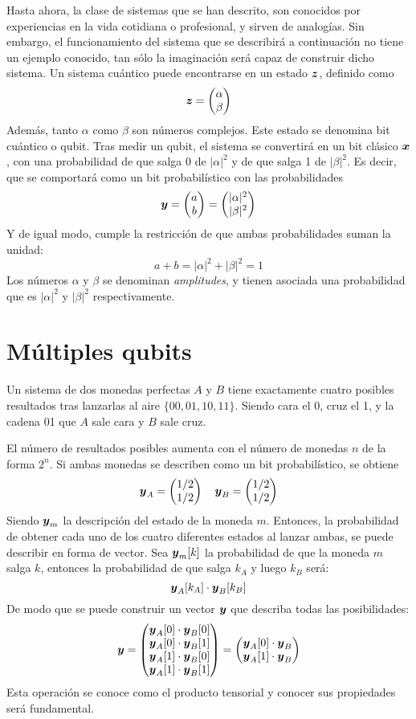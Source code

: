 Hasta ahora, la clase de sistemas que se han descrito, son conocidos por 
experiencias en la vida cotidiana o profesional, y sirven de analogías. Sin 
embargo, el funcionamiento del sistema que se describirá a continuación no tiene 
un ejemplo conocido, tan sólo la imaginación será capaz de construir dicho 
sistema.
%
Un sistema cuántico puede encontrarse en un estado $\boldsymbol{z}$, definido como
%
$$ \boldsymbol{z} = \begin{pmatrix} \alpha \\ \beta \end{pmatrix}$$
%
Además, tanto $\alpha$ como $\beta$ son números complejos. Este estado se 
denomina bit cuántico o qubit.
%
Tras medir un qubit, el sistema se convertirá en un bit clásico $\boldsymbol{x}$, con una 
probabilidad de que salga 0 de $|\alpha|^2$ y de que salga 1 de $|\beta|^2$.
Es decir, que se comportará como un bit probabilístico con las probabilidades
%
$$ \boldsymbol{y} = \begin{pmatrix} a \\ b \end{pmatrix} = \begin{pmatrix} |\alpha|^2 \\ |\beta|^2 \end{pmatrix}$$
%
Y de igual modo, cumple la restricción de que ambas probabilidades suman la 
unidad:
%
$$ a + b = |\alpha|^2 + |\beta|^2 = 1 $$
%
Los números $\alpha$ y $\beta$ se denominan \textit{amplitudes}, y tienen 
asociada una probabilidad que es $|\alpha|^2$ y $|\beta|^2$ respectivamente.

\section{Múltiples qubits}
Un sistema de dos monedas perfectas $A$ y $B$ tiene exactamente cuatro posibles 
resultados tras lanzarlas al aire $\{00, 01, 10, 11\}$. Siendo cara el 0, cruz 
el 1, y la cadena 01 que $A$ sale cara y $B$ sale cruz.

El número de resultados posibles aumenta con el número de monedas $n$ de la 
forma $2^n$. Si ambas monedas se describen como un bit probabilístico, se 
obtiene
$$ \boldsymbol{y}_A = \begin{pmatrix} 1/2 \\ 1/2 \end{pmatrix} \quad \boldsymbol{y}_B = \begin{pmatrix} 1/2 \\ 1/2 \end{pmatrix} $$
Siendo $\boldsymbol{y}_m$ la descripción del estado de la moneda $m$. Entonces, la 
probabilidad de obtener cada uno de los cuatro diferentes estados al lanzar 
ambas, se puede describir en forma de vector.
Sea $\boldsymbol{y}_m[k]$ la probabilidad de que la moneda $m$ salga $k$, entonces la 
probabilidad de que salga $k_A$ y luego $k_B$ será:
$$ \boldsymbol{y}_A[k_A] \cdot \boldsymbol{y}_B[k_B] $$
De modo que se puede construir un vector $\boldsymbol{y}$ que describa todas las 
posibilidades:
$$ \boldsymbol{y} = \begin{pmatrix} 
	\boldsymbol{y}_A[0] \cdot \boldsymbol{y}_B[0] \\ \boldsymbol{y}_A[0] \cdot \boldsymbol{y}_B[1] \\
	\boldsymbol{y}_A[1] \cdot \boldsymbol{y}_B[0] \\ \boldsymbol{y}_A[1] \cdot \boldsymbol{y}_B[1]
 \end{pmatrix}
= \begin{pmatrix} 
	\boldsymbol{y}_A[0] \cdot \boldsymbol{y}_B \\
	\boldsymbol{y}_A[1] \cdot \boldsymbol{y}_B
 \end{pmatrix} $$
Esta operación se conoce como el producto tensorial y conocer sus propiedades
será fundamental.

